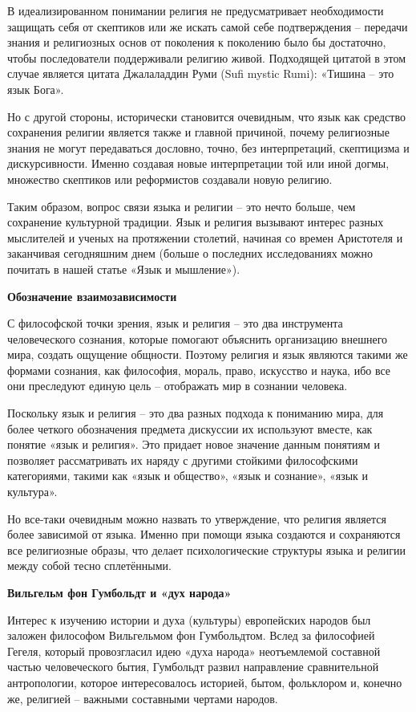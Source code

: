 В идеализированном понимании религия не предусматривает необходимости защищать себя от скептиков или же искать самой себе подтверждения – передачи знания и религиозных основ от поколения к поколению было бы достаточно, чтобы последователи поддерживали религию живой. Подходящей цитатой в этом случае является цитата Джалаладдин Руми (Sufi mystic Rumi): «Тишина – это язык Бога».

Но с другой стороны, исторически становится очевидным, что язык как средство сохранения религии является также и главной причиной, почему религиозные знания не могут передаваться дословно, точно, без интерпретаций, скептицизма и дискурсивности. Именно создавая новые интерпретации той или иной догмы, множество скептиков или реформистов создавали новую религию.

Таким образом, вопрос связи языка и религии – это нечто больше, чем сохранение культурной традиции. Язык и религия вызывают интерес разных мыслителей и ученых на протяжении столетий, начиная со времен Аристотеля и заканчивая сегодняшним днем (больше о последних исследованиях можно почитать в нашей статье «Язык и мышление»).

\textbf{Обозначение взаимозависимости}

С философской точки зрения, язык и религия – это два инструмента человеческого сознания, которые помогают объяснить организацию внешнего мира, создать ощущение общности. Поэтому религия и язык являются такими же формами сознания, как философия, мораль, право, искусство и наука, ибо все они преследуют единую цель – отображать мир в сознании человека.

Поскольку язык и религия – это два разных подхода к пониманию мира, для более четкого обозначения предмета дискуссии их используют вместе, как понятие «язык и религия». Это придает новое значение данным понятиям и позволяет рассматривать их наряду с другими стойкими философскими категориями, такими как «язык и общество», «язык и сознание», «язык и культура».

Но все-таки очевидным можно назвать то утверждение, что религия является более зависимой от языка. Именно при помощи языка создаются и сохраняются все религиозные образы, что делает психологические структуры языка и религии между собой тесно сплетёнными.

\textbf{Вильгельм фон Гумбольдт и «дух народа»}

Интерес к изучению истории и духа (культуры) европейских народов был заложен философом Вильгельмом фон Гумбольдтом. Вслед за философией Гегеля, который провозгласил идею «духа народа» неотъемлемой составной частью человеческого бытия, Гумбольдт развил направление сравнительной антропологии, которое интересовалось историей, бытом, фольклором и, конечно же, религией – важными составными чертами народов.

